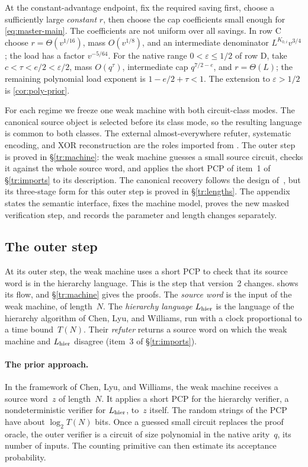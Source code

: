 \documentclass[11pt,letterpaper]{article}
\theoremstyle{definition}
\theoremstyle{remark}
\begin{document}
At the constant-advantage endpoint, fix the required saving first,
choose a sufficiently large \emph{constant} $r$, then choose the cap
coefficients small enough for \cref{eq:master-main}. The coefficients
are not uniform over all savings. In row C choose
$r=\Theta(v^{1/16})$, mass $O(v^{1/8})$, and an intermediate
denominator $L^{K_{0,i}}v^{3/4}$; the load has a factor $v^{-5/64}$.
For the native range $0<\varepsilon\le1/2$ of row D, take
$c<\tau<e/2<\varepsilon/2$, mass $O(q^\tau)$,
intermediate cap $q^{7/2-e}$, and $r=\Theta(L)$; the remaining
polynomial load exponent is $1-e/2+\tau<1$.
The extension to $\varepsilon>1/2$ is \cref{cor:poly-prior}.

For each regime we freeze one weak machine with both circuit-class
modes. The canonical source object is selected before its class mode,
so the resulting language is common to both classes. The external
almost-everywhere refuter, systematic encoding, and XOR reconstruction
are the roles imported from \cite{CLW,NagCubic}. The outer
step is proved in \S\ref{tr:machine}: the weak machine guesses a small
source circuit, checks it against the whole source word, and applies
the short PCP of item~1 of \S\ref{tr:imports} to its description. The canonical
recovery follows the design of~\cite{CLW}, but its three-stage form for
this outer step is proved in \S\ref{tr:lengths}. The appendix states the semantic interface, fixes
the machine model, proves the new masked verification step, and records
the parameter and length changes separately.


\subsection{The outer step}
\label{sec:outer-overview}

At its outer step, the weak machine uses a short PCP to check that its
source word is in the hierarchy language. This is the step that
version~2 changes.  shows its flow, and \S\ref{tr:machine} gives
the proofs. The \emph{source word} is the input of the weak machine, of
length~$N$. The \emph{hierarchy language} $L_{\rm hier}$ is the language
of the hierarchy algorithm of Chen, Lyu, and Williams, run with a clock
proportional to a time bound~$T(N)$. Their \emph{refuter} returns a
source word on which the weak machine and $L_{\rm hier}$ disagree
(item~3 of \S\ref{tr:imports}).

\paragraph{The prior approach.} In the framework of Chen, Lyu, and
Williams, the weak machine receives a source word~$z$ of length~$N$.
It applies a short PCP for the hierarchy verifier, a nondeterministic
verifier for $L_{\rm hier}$, to~$z$ itself. The random strings of the
PCP have about $\log_2T(N)$ bits. Once a guessed small circuit replaces the proof
oracle, the outer verifier is a circuit of size polynomial in the
native arity~$q$, its number of inputs. The counting primitive can
then estimate its acceptance probability.
\end{document}
